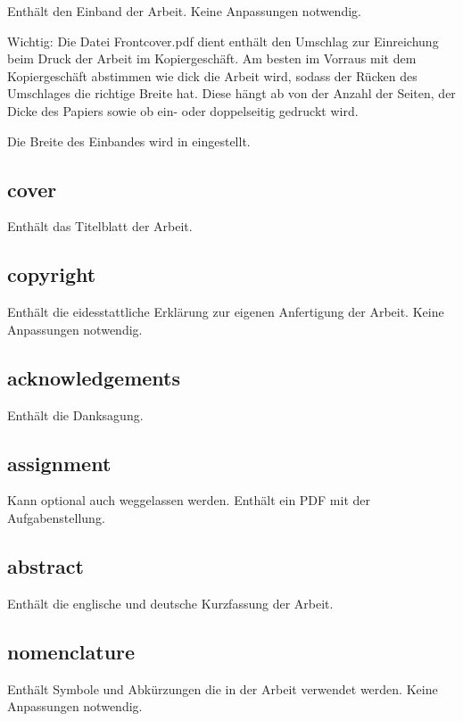 Enthält den Einband der Arbeit. Keine Anpassungen notwendig.

Wichtig: Die Datei Frontcover.pdf dient enthält den Umschlag zur Einreichung beim Druck der Arbeit im Kopiergeschäft. Am besten im Vorraus mit dem Kopiergeschäft abstimmen wie dick die Arbeit wird, sodass der Rücken des Umschlages die richtige Breite hat. Diese hängt ab von der Anzahl der Seiten, der Dicke des Papiers sowie ob ein- oder doppelseitig gedruckt wird. 

Die Breite des Einbandes wird in  eingestellt.

\subsection*{cover}

Enthält das Titelblatt der Arbeit. 

\subsection*{copyright}

Enthält die eidesstattliche Erklärung zur eigenen Anfertigung der Arbeit. Keine Anpassungen notwendig.

\subsection*{acknowledgements}

Enthält die Danksagung. 

\subsection*{assignment}

Kann optional auch weggelassen werden. Enthält ein PDF mit der Aufgabenstellung.

\subsection*{abstract}

Enthält die englische und deutsche Kurzfassung der Arbeit.

\subsection*{nomenclature}

Enthält Symbole und Abkürzungen die in der Arbeit verwendet werden. Keine Anpassungen notwendig.


